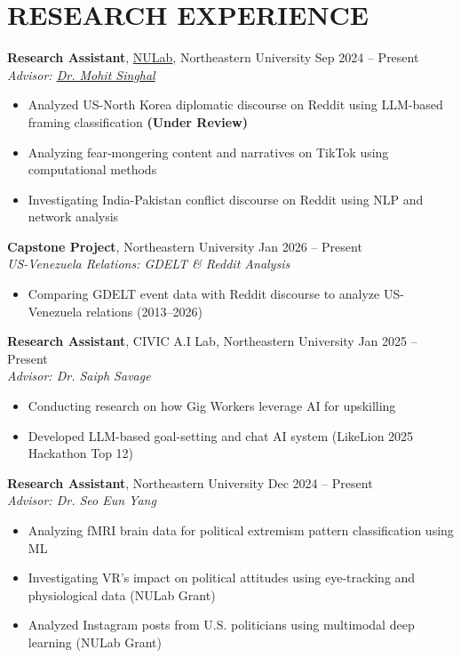 \documentclass[11pt,a4paper]{article}
\begin{document}
\section{RESEARCH EXPERIENCE}

\textbf{Research Assistant}, \href{https://cssh.northeastern.edu/nulab/}{NULab}, Northeastern University \hfill Sep 2024 -- Present\\
\textit{Advisor: \href{https://msinghal10.github.io/}{Dr. Mohit Singhal}}
\begin{itemize}[leftmargin=1.5em, nosep]
    \item Analyzed US-North Korea diplomatic discourse on Reddit using LLM-based framing classification \textbf{(Under Review)}
    \item Analyzing fear-mongering content and narratives on TikTok using computational methods
    \item Investigating India-Pakistan conflict discourse on Reddit using NLP and network analysis
\end{itemize}

\textbf{Capstone Project}, Northeastern University \hfill Jan 2026 -- Present\\
\textit{US-Venezuela Relations: GDELT \& Reddit Analysis}
\begin{itemize}[leftmargin=1.5em, nosep]
    \item Comparing GDELT event data with Reddit discourse to analyze US-Venezuela relations (2013--2026)
\end{itemize}

\textbf{Research Assistant}, CIVIC A.I Lab, Northeastern University \hfill Jan 2025 -- Present\\
\textit{Advisor: Dr. Saiph Savage}
\begin{itemize}[leftmargin=1.5em, nosep]
    \item Conducting research on how Gig Workers leverage AI for upskilling
    \item Developed LLM-based goal-setting and chat AI system (LikeLion 2025 Hackathon Top 12)
\end{itemize}

\textbf{Research Assistant}, Northeastern University \hfill Dec 2024 -- Present\\
\textit{Advisor: Dr. Seo Eun Yang}
\begin{itemize}[leftmargin=1.5em, nosep]
    \item Analyzing fMRI brain data for political extremism pattern classification using ML
    \item Investigating VR's impact on political attitudes using eye-tracking and physiological data (NULab Grant)
    \item Analyzed Instagram posts from U.S. politicians using multimodal deep learning (NULab Grant)
\end{itemize}
\end{document}
